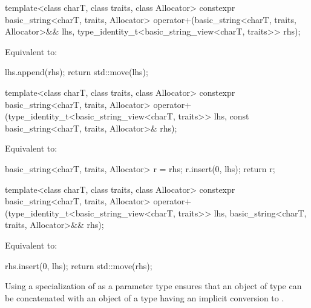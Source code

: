 %
\begin{itemdecl}
template<class charT, class traits, class Allocator>
  constexpr basic_string<charT, traits, Allocator>
    operator+(basic_string<charT, traits, Allocator>&& lhs,
              type_identity_t<basic_string_view<charT, traits>> rhs);
\end{itemdecl}

\begin{itemdescr}
\pnum
Equivalent to:
\begin{codeblock}
lhs.append(rhs);
return std::move(lhs);
\end{codeblock}
\end{itemdescr}

%
\begin{itemdecl}
template<class charT, class traits, class Allocator>
  constexpr basic_string<charT, traits, Allocator>
    operator+(type_identity_t<basic_string_view<charT, traits>> lhs,
              const basic_string<charT, traits, Allocator>& rhs);
\end{itemdecl}

\begin{itemdescr}
\pnum
Equivalent to:
\begin{codeblock}
basic_string<charT, traits, Allocator> r = rhs;
r.insert(0, lhs);
return r;
\end{codeblock}
\end{itemdescr}

%
\begin{itemdecl}
template<class charT, class traits, class Allocator>
  constexpr basic_string<charT, traits, Allocator>
    operator+(type_identity_t<basic_string_view<charT, traits>> lhs,
              basic_string<charT, traits, Allocator>&& rhs);
\end{itemdecl}

\begin{itemdescr}
\pnum
Equivalent to:
\begin{codeblock}
rhs.insert(0, lhs);
return std::move(rhs);
\end{codeblock}
\end{itemdescr}

\pnum
\begin{note}
Using a specialization of  as a parameter type ensures
that an object of type 
can be concatenated with an object of a type 
having an implicit conversion to
.
\end{note}

